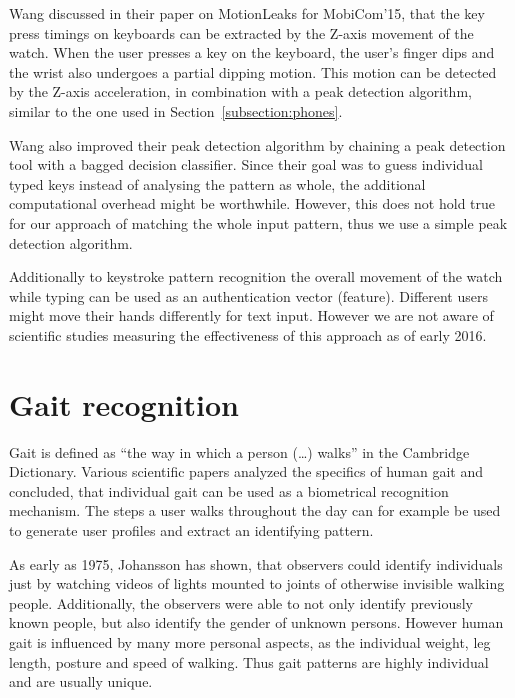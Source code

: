 Wang \etal\cite{wang2015mole} discussed in their paper on MotionLeaks for MobiCom'15, that the key press timings on keyboards can be extracted by the Z-axis movement of the watch. When the user presses a key on the keyboard, the user's finger dips and the wrist also undergoes a partial dipping motion. This motion can be detected by the Z-axis acceleration, in combination with a peak detection algorithm, similar to the one used in Section~\ref{subsection:phones}.

Wang \etal also improved their peak detection algorithm by chaining a peak detection tool with a bagged decision classifier. Since their goal was to guess individual typed keys instead of analysing the pattern as whole, the additional computational overhead might be worthwhile. However, this does not hold true for our approach of matching the whole  input pattern, thus we use a simple peak detection algorithm.

Additionally to keystroke pattern recognition the overall movement of the watch while typing can be used as an authentication vector (\ie feature). Different users might move their hands differently for text input. However we are not aware of scientific studies measuring the effectiveness of this approach as of early 2016.

\section{Gait recognition}
Gait is defined as ``the way in which a person (\ldots) walks'' in the Cambridge Dictionary. Various scientific papers analyzed the specifics of human gait \cite{johansson1975visual, lee2002gait, johnstonsmartwatch} and concluded, that individual gait can be used as a biometrical recognition mechanism. The steps a user walks throughout the day can for example be used to generate user profiles and extract an identifying pattern. 

As early as 1975, Johansson \cite{johansson1975visual} has shown, that observers could identify individuals just by watching videos of lights mounted to joints of otherwise invisible walking people. Additionally, the observers were able to not only identify previously known people, but also identify the gender of unknown persons. However human gait is influenced by many more personal aspects, as the individual weight, leg length, posture and speed of walking. Thus gait patterns are highly individual and are usually unique.

